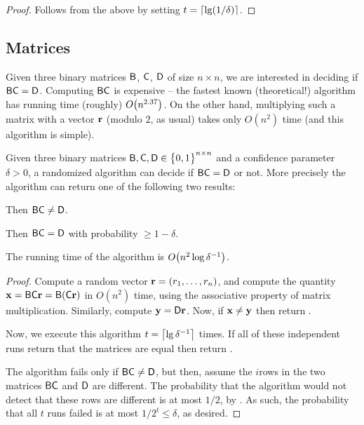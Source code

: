 \begin{proof}
    Follows from the above by setting $t= \left\lceil {\lg (1/\delta)} \right\rceil$.
\end{proof}

\subsection{Matrices}

Given three binary matrices $\mathsf{B}$, $\mathsf{C}$, $\mathsf{D}$ of size
$n \times n$, we are interested in deciding if
$\mathsf{B} \mathsf{C} = \mathsf{D}$. Computing $\mathsf{B} \mathsf{C}$ is
expensive -- the fastest known (theoretical!) algorithm has running
time (roughly) $O\pth{n^{2.37}}$. On the other hand, multiplying such
a matrix with a vector $\mathbf{r}$ (modulo $2$, as usual) takes only
$O(n^{2})$ time (and this algorithm is simple).
 

\begin{lemma}
    Given three binary matrices
    $\mathsf{B}, \mathsf{C}, \mathsf{D} \in \left\{ {\bigl. 0,1} \right\}^{n\times n}$
    and a confidence parameter $\delta > 0$, a randomized algorithm
    can decide if $\mathsf{B} \mathsf{C} = \mathsf{D}$ or not. More
    precisely the algorithm can return one of the following two
    results:
    \begin{compactenumA}
        \item[\qquad$\boldsymbol \ne$:] Then $\mathsf{B} \mathsf{C}
        \neq \mathsf{D}$.

        \item[\qquad $\boldsymbol =$:] Then
        $\mathsf{B} \mathsf{C} = \mathsf{D}$ with probability
        $\geq 1 -\delta$.
    \end{compactenumA}
    The running time of the algorithm is
    $ O\pth{ \bigl.  n^2 \log \delta^{-1} }$.
\end{lemma}

\begin{proof}
    Compute a random vector $\mathbf{r} = ( r_1, \ldots, r_n)$, and
    compute the quantity
    $\vecX = \MatrixB \MatrixC \vecRand = \MatrixB \pth[]{ \MatrixC
       \vecRand }$ in $O(n^2)$ time, using the associative property of
    matrix multiplication. Similarly, compute
    $\mathbf{y} = \mathsf{D} \mathbf{r}$. Now, if $\mathbf{x} \neq \mathbf{y}$ then
    return \RetNEq.

    Now, we execute this algorithm $t = \left\lceil {\lg \delta^{-1}} \right\rceil$
    times. If all of these independent runs return that the matrices
    are equal then return \RetEq.

    The algorithm fails only if $\mathsf{B} \mathsf{C} \neq \mathsf{D}$, but
    then, assume the $i$\th rows in the two matrices $\mathsf{B} \mathsf{C}$
    and $\mathsf{D}$ are different. The probability that the algorithm
    would not detect that these rows are different is at most $1/2$,
    by . As such, the probability that all
    $t$ runs failed is at most $1/2^t \leq \delta$, as desired.
\end{proof}

